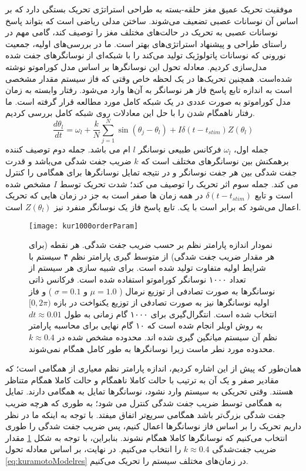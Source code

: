 موفقیت تحریک عمیق مغز حلقه-بسته به طراحی استراتژی تحریک بستگی دارد که بر اساس آن نوسانات عصبی تضعیف می‌شوند.  ساختن مدلی ریاضی است که بتواند پاسخ نوسانات عصبی به تحریک در حالت‌های مختلف مغز را توصیف کند، گامی مهم در راستای طراحی و پیشنهاد استراتژی‌های بهتر است.
ما در بررسی‌های اولیه، جمعیت نورونی که نوسانات پاتولوژیک تولید می‌کند را با شبکه‌ای از نوسانگرهای جفت شده مدل‌سازی کردیم. معادله تحول این نوسانگرها بر اساس مدل کوراموتو نوشته شده‌است. همچنین تحریک‌ها در یک لحظه خاص وقتی که فاز سیستم مقدار مشخصی است به اندازه تابع پاسخ فاز هر نوسانگر به آن‌ها وارد می‌شود.
رفتار وابسته به زمان مدل کوراموتو به صورت عددی در یک شبکه کامل مورد مطالعه قرار گرفته است. ما رفتار ناهمگام شدن را با حل این معادلات روی شبکه کامل بررسی کردیم.
\begin{equation}
    \frac{d \theta_l}{dt} = \omega_l + \frac{k}{N} \sum_{j=1}^{N} \sin(\theta_j -\theta_l) + I \delta(t-t_{stim}) Z(\theta_l)
    \label{eq:kuramotoModelres}
\end{equation}
جمله اول، 
$\omega_l$
فرکانس طبیعی نوسانگر 
$l$ 
ام می باشد.
جمله دوم توصیف کننده برهمکنش بین نوسانگرهای مختلف است که 
$k$
ضریب جفت شدگی می‌باشد و قدرت جفت شدگی بین هر جفت نوسانگر و در نتیجه تمایل نوسانگرها برای همگامی را کنترل می کند. 
جمله سوم اثر تحریک را توصیف می کند؛ شدت تحریک توسط 
$I$
مشخص شده است و تابع 
$\delta(t-t_{stim})$
در همه زمان ها صفر است به جز در زمان هایی که تحریک اعمال می‌شود که برابر است با یک.
تابع پاسخ فاز یک نوسانگر منفرد نیز
$Z(\theta_l)$
است.


\begin{figure}
	\centering
	\texttt{[image: kur1000orderParam]}
    \caption{
نمودار اندازه پارامتر نظم بر حسب ضریب جفت شدگی. هر نقطه (برای هر مقدار ضریب جفت شدگی) از متوسط گیری پارامتر نظم ۴ سیستم با شرایط اولیه متفاوت تولید شده است. برای شبیه سازی هر سیستم از تعداد ۱۰۰۰ نوسانگر کوراموتو استفاده شده است. فرکانس ذاتی نوسانگرها به صورت تصادفی از توزیع نرمال (
$\mu=1.0$  و $\sigma=0.1$
) و فاز اولیه نوسانگرها نیز به صورت تصادفی از توزیع یکنواخت در بازه 
$[0,2\pi)$
انتخاب شده است. انتگرال‌گیری برای ۱۰۰۰ گام زمانی به طول
 $dt \approx 0.01$
 به روش اویلر انجام شده است که ۱۰ گام نهایی برای محاسبه پارامتر نظم آن سیستم میانگین گیری شده اند. محدوده مشخص شده در 
 $k \approx 0.4$
 محدوده مورد نطر ماست زیرا نوسانگرها به طور کامل همگام نمی‌شوند.
    }
    \label{fig:orderParam-k}
\end{figure}

همان‌طور که پیش از این اشاره کردیم، اندازه پارامتر نظم معیاری از همگامی است؛ که مقادیر صفر و یک آن به ترتیب با حالت کاملا ناهمگام و حالت کاملا همگام متناظر هستند. وقتی تحریکی به سیستم وارد نشود، نوسانگرها تمایل به همگامی دارند. تمایل به همگامی توسط ضریب جفت شدگی کنترل می شود؛ به طوری که هرچه ضریب جفت شدگی بزرگ‌تر باشد همگامی سریع‌تر اتفاق میفتد. با توجه به اینکه ما در نظر داریم تحریک‌ را بر اساس فاز نوسانگرها اعمال کنیم، پس ضریب جفت شدگی را طوری انتخاب می‌کنیم که نوسانگرها کاملا همگام نشوند. بنابراین، با توجه به شکل 
\ref{fig:orderParam-k}
مقدار ضریب جفت‌شدگی 
$k \approx 0.4$
را انتخاب می‌کنیم. در نهایت، بر اساس معادله تحول 
\ref{eq:kuramotoModelres}
در زمان‌های مختلف سیستم را تحریک می‌کنیم.


